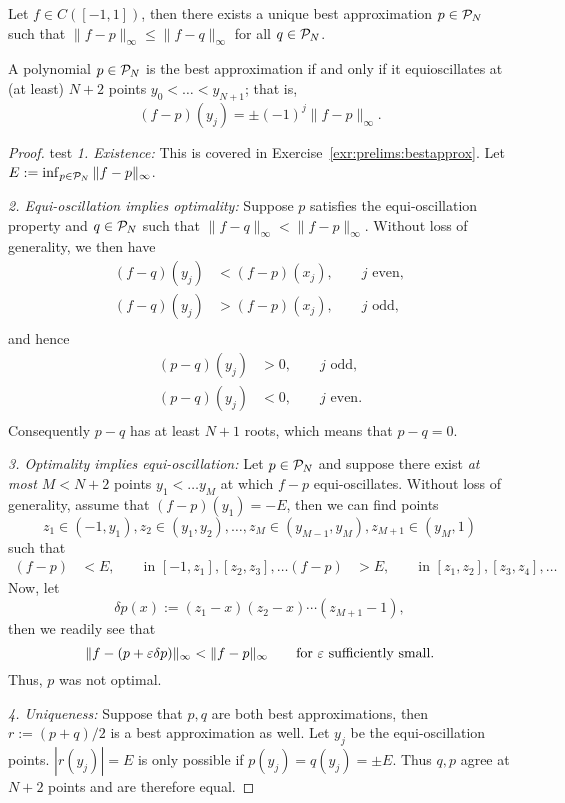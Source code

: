 \begin{theorem} \label{th:poly:bestapprox}
   Let $f \in C([-1,1])$, then there exists a unique best approximation
   $p \in \mathcal{P}_N$ such that $\|f - p \|_\infty \leq \|f-q\|_\infty$ for
   all $q \in \mathcal{P}_N$.

   A polynomial $p \in \mathcal{P}_N$ is the best approximation if and only if
   it equioscillates at (at least) $N+2$ points $y_0 < \dots < y_{N+1}$;
   that is,
   \[
      (f-p)(y_j) = \pm (-1)^j \|f-p\|_\infty.
   \]
\end{theorem}
\begin{proof}
   test
   {\it 1. Existence: } This is covered in
   Exercise~\ref{exr:prelims:bestapprox}. Let $E := \inf_{p \in \mathcal{P}_N}
   \|f-p\|_\infty$.

   {\it 2. Equi-oscillation implies optimality: } Suppose $p$ satisfies
   the equi-oscillation property and $q \in \mathcal{P}_N$ such that
   $\|f-q\|_\infty < \|f-p\|_\infty$. Without loss of generality, we then have
   \begin{align*}
      (f-q)(y_j) &< (f-p)(x_j), \qquad j \text{ even},  \\
      (f-q)(y_j) &> (f-p)(x_j), \qquad j \text{ odd}, \\
   \end{align*}
   and hence
   \begin{align*}
      (p-q)(y_j) &> 0, \qquad j \text{ odd}, \\
      (p-q)(y_j) &< 0, \qquad j \text{ even}.  \\
   \end{align*}
   Consequently $p-q$ has at least $N+1$ roots, which means that $p - q = 0$.

   {\it 3. Optimality implies equi-oscillation: } Let $p \in \mathcal{P}_N$ and
   suppose there exist {\em at most} $M < N+2$ points $y_1 < \dots y_M$ at which
   $f-p$ equi-oscillates. Without loss of generality, assume that $(f-p)(y_1) =
   -E$, then we can find points
   \[
      z_1 \in (-1, y_1), z_2 \in (y_1, y_2), \dots,
      z_M \in (y_{M-1}, y_M), z_{M+1} \in (y_M, 1)
   \]
   such that
   \begin{align*}
      (f-p) &< E, \qquad \text{in } [-1, z_1], [z_2, z_3], \dots
      (f-p) &> E, \qquad \text{in } [z_1, z_2], [z_3, z_4], \dots
   \end{align*}
   Now, let
   \[
      \delta p(x) := (z_1 - x)(z_2-x)\cdots(z_{M+1}-1),
   \]
   then we readily see that
   \[
      \|f - (p + \varepsilon \delta p)\|_\infty < \|f - p\|_\infty
      \qquad \text{for $\varepsilon$ sufficiently small.}
   \]
   Thus, $p$ was not optimal.

   {\it 4. Uniqueness: } Suppose that $p, q$ are both best approximations, then
   $r := (p+q)/2$ is a best approximation as well. Let $y_j$ be the
   equi-oscillation points. $|r(y_j)| = E$ is only possible if $p(y_j) = q(y_j)
   = \pm E$. Thus $q, p$ agree at $N+2$ points and are therefore equal.
\end{proof}

